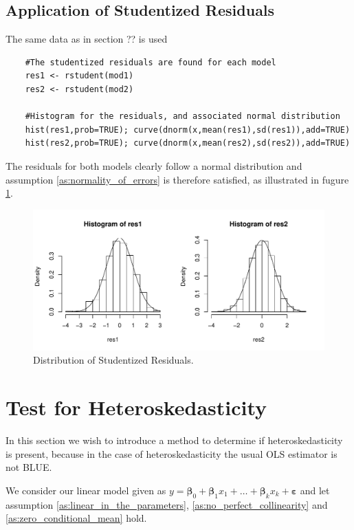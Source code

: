 \subsection{Application of Studentized Residuals}

The same data as in section ?? is used
\begin{lstlisting}
    #The studentized residuals are found for each model
    res1 <- rstudent(mod1)
    res2 <- rstudent(mod2)
    
    #Histogram for the residuals, and associated normal distribution
    hist(res1,prob=TRUE); curve(dnorm(x,mean(res1),sd(res1)),add=TRUE)
    hist(res2,prob=TRUE); curve(dnorm(x,mean(res2),sd(res2)),add=TRUE)
\end{lstlisting}
The residuals for both models clearly follow a normal distribution and assumption \ref{as:normality_of_errors} is therefore satisfied, as illustrated in fugure \ref{fig:studentized_res_plot}.
    \begin{figure}[H]
        \centering
      \includegraphics[width = 1 \textwidth]{figures/Histogram_Residuals.pdf}
      \caption{Distribution of Studentized Residuals.}
      \label{fig:studentized_res_plot}
    \end{figure}


\section{Test for Heteroskedasticity}
In this section we wish to introduce a method to determine if heteroskedasticity is present, because in the case of heteroskedasticity the usual OLS estimator is not BLUE. 

We consider our linear model given as $y = \mathbf{\beta}_0 + \mathbf{\beta}_1x_1 + \ldots + \mathbf{\beta}_kx_k + \mathbf{\varepsilon}$ and let assumption \ref{as:linear_in_the_parameters}, \ref{as:no_perfect_collinearity} and \ref{as:zero_conditional_mean} hold.

